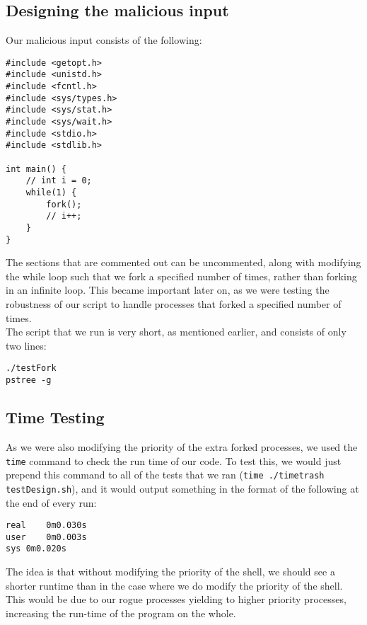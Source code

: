 \documentclass{article}
\begin{document}
\subsection{Designing the malicious input}
Our malicious input consists of the following:

\begin{lstlisting}
#include <getopt.h>
#include <unistd.h>
#include <fcntl.h>
#include <sys/types.h>
#include <sys/stat.h>
#include <sys/wait.h>
#include <stdio.h>
#include <stdlib.h>

int main() {
	// int i = 0;
	while(1) {
		fork();
		// i++;
	}
}
\end{lstlisting}
The sections that are commented out can be uncommented, along with modifying 
the while loop such that we fork a specified number of times, rather than
forking in an infinite loop. This became important later on, as we were testing
the robustness of our script to handle processes that forked a specified 
number of times. \\

The script that we run is very short, as mentioned earlier, and consists of 
only two lines:
\begin{lstlisting}
./testFork
pstree -g
\end{lstlisting}

\subsection{Time Testing}
As we were also modifying the priority of the extra forked processes, we used
the \verb+time+ command to check the run time of our code. To test this, we
would just prepend this command to all of the tests that we ran
(\verb+time ./timetrash testDesign.sh+), and it would output something in the 
format of the following at the end of every run:
\begin{lstlisting}
real	0m0.030s
user	0m0.003s
sys	0m0.020s
\end{lstlisting}
The idea is that without modifying the priority of the shell, we should see a
shorter runtime than in the case where we do modify the priority of the shell.
This would be due to our rogue processes yielding to higher priority processes,
increasing the run-time of the program on the whole.\\

\end{document}
